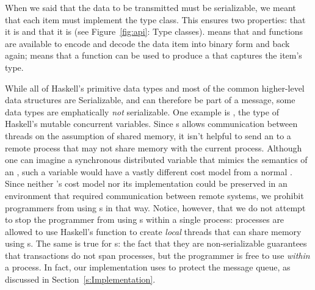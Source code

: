 \documentclass{sigplanconf}
\begin{document}
When we said that the data to be transmitted must be serializable, we meant that each item must implement the  type class.  This ensures two properties: that it is  and that it is  (see Figure~\ref{fig:api}: Type classes).
 means that  and  functions are available to encode and decode the data item into binary form and back again;  means that a function  can be used to produce a  that captures the item's type.  

While all of Haskell's primitive data types and most of the common higher-level data structures are \textsf{Serializable}, and can therefore be part of a message, some data types are emphatically \emph{not} serializable. 
One example is , the type of Haskell's mutable concurrent variables. Since s allows communication between threads on the assumption of shared memory, it isn't helpful to send an  to a remote process that may not share memory with the current process. 
Although one can imagine a synchronous distributed variable that mimics the semantics of an , such a variable would have a vastly different cost model from a normal . 
Since neither 's cost model nor its implementation could be preserved in an environment that required communication between remote systems, we  prohibit programmers from using s in that way.  
Notice, however, that we do not attempt to stop the programmer from using s within a single process: processes are allowed to use Haskell's  function to create \emph{local} threads that can share memory using s.
The same is true for s: the fact that they are non-serializable guarantees that  transactions 
do not span processes, but the programmer is free to use  \emph{within} a process.  
In fact, our implementation uses  to protect the message queue, as discussed in Section~\ref{s:Implementation}.

\end{document}
